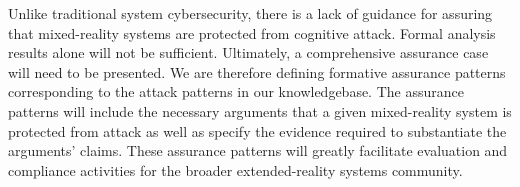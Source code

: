 Unlike traditional system cybersecurity, there is a lack of guidance for assuring that mixed-reality systems are protected from cognitive attack. Formal analysis results alone will not be sufficient. Ultimately, a comprehensive assurance case will need to be presented. We are therefore defining formative assurance patterns corresponding to the attack patterns in our knowledgebase. The assurance patterns will include the necessary arguments that a given mixed-reality system is protected from attack as well as specify the evidence required to substantiate the arguments’ claims. These assurance patterns will greatly facilitate evaluation and compliance activities for the broader extended-reality systems community.